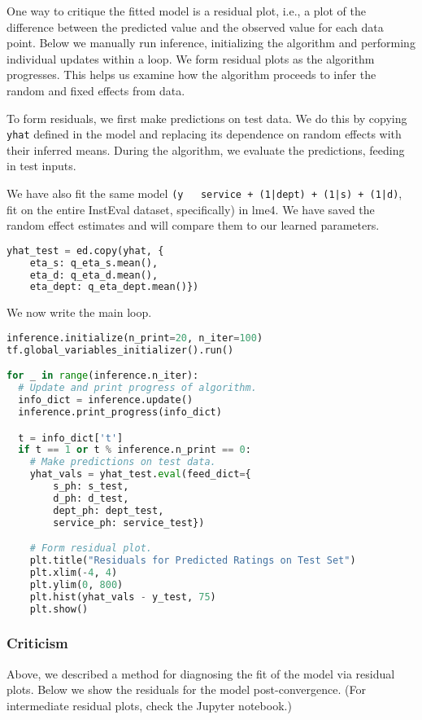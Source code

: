 One way to critique the fitted model is a residual plot, i.e., a
plot of the difference between the predicted value and the observed
value for each data point. Below we manually run inference,
initializing the algorithm and performing individual updates within a
loop. We form residual plots as the algorithm progresses. This helps
us examine how the algorithm proceeds to infer the random and fixed
effects from data.

To form residuals, we first make predictions on test data. We do this
by copying \texttt{yhat} defined in the model and replacing its
dependence on random effects with their inferred means. During the
algorithm, we evaluate the predictions, feeding in test inputs.

We have also fit the same model
\texttt{(y ~ service + (1|dept) + (1|s) + (1|d)},
fit on the entire InstEval dataset, specifically) in lme4. We
have saved the random effect estimates and will compare them to our
learned parameters.

\begin{lstlisting}[language=Python]
yhat_test = ed.copy(yhat, {
    eta_s: q_eta_s.mean(),
    eta_d: q_eta_d.mean(),
    eta_dept: q_eta_dept.mean()})
\end{lstlisting}

We now write the main loop.

\begin{lstlisting}[language=Python]
inference.initialize(n_print=20, n_iter=100)
tf.global_variables_initializer().run()

for _ in range(inference.n_iter):
  # Update and print progress of algorithm.
  info_dict = inference.update()
  inference.print_progress(info_dict)

  t = info_dict['t']
  if t == 1 or t % inference.n_print == 0:
    # Make predictions on test data.
    yhat_vals = yhat_test.eval(feed_dict={
        s_ph: s_test,
        d_ph: d_test,
        dept_ph: dept_test,
        service_ph: service_test})

    # Form residual plot.
    plt.title("Residuals for Predicted Ratings on Test Set")
    plt.xlim(-4, 4)
    plt.ylim(0, 800)
    plt.hist(yhat_vals - y_test, 75)
    plt.show()
\end{lstlisting}

\subsubsection{Criticism}

Above, we described a method for diagnosing the fit of the model via
residual plots.
Below we show the residuals for the model post-convergence. (For
intermediate residual plots, check the Jupyter notebook.)

